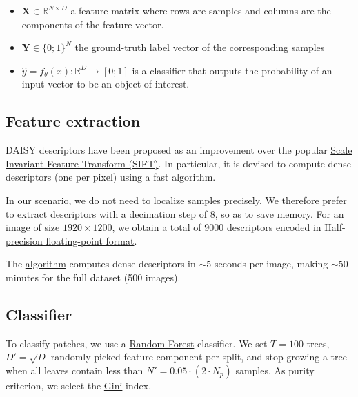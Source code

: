 \documentclass[11pt]{article}
\begin{document}
\begin{itemize}
\item \(\bm{X} \in \mathbb{R}^{N \times D}\) a feature matrix where rows are samples and columns
are the components of the feature vector.
\item \(\bm{Y} \in \{0;1\}^N\) the ground-truth label vector of the corresponding samples
\item \(\hat{y}= f_{\theta}(x): \mathbb{R}^{D} \rightarrow [0;1]\) is a classifier that outputs the probability of an input vector to be an object of interest.
\end{itemize}

\subsection{Feature extraction}
\label{sec:org934fb94}

DAISY descriptors have been proposed as an improvement over the popular \href{https://en.wikipedia.org/wiki/Scale-invariant\_feature\_transform}{Scale Invariant Feature Transform (SIFT)}.
In particular, it is devised to compute dense descriptors (one per pixel) using a fast algorithm.

In our scenario, we do not need to localize samples precisely.
We therefore prefer to extract descriptors with a decimation step of \(8\), so as to save memory.
For an image of size \(1920 \times 1200\), we obtain a total of \(9000\) descriptors encoded in \href{https://en.wikipedia.org/wiki/Half-precision\_floating-point\_format}{Half-precision floating-point format}.

The \href{https://github.com/scikit-image/scikit-image/blob/main/skimage/feature/\_daisy.py\#L9-L222}{algorithm} computes dense descriptors in \(\sim 5\) seconds per image, making \(\sim 50\) minutes for the full dataset (500 images).

\subsection{Classifier}
\label{sec:org0f61b03}

To classify patches, we use a \href{https://en.wikipedia.org/wiki/Random\_forest}{Random Forest} classifier.
We set \(T=100\) trees, \(D'=\sqrt{D}\) randomly picked feature component per split, and stop growing a tree
when all leaves contain less than \(N'=0.05 \cdot (2 \cdot N_p)\) samples.
As purity criterion, we select the \href{https://en.wikipedia.org/wiki/Gini\_coefficient}{Gini} index.
\end{document}
